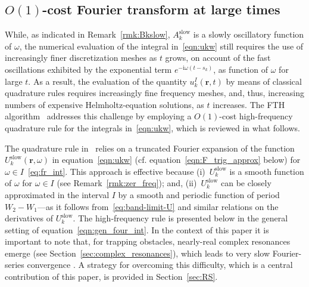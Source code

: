 \documentclass[11pt]{article}
\theoremstyle{plain}
\theoremstyle{remark}
\def \br{\mathbf{r}}
\begin{document}
\subsection{$O(1)$-cost Fourier transform at large times}\label{sec:inv_four_tran}
While, as indicated in Remark~\ref{rmk:Bkslow}, $A_k^{\mathrm{slow}}$
is a slowly oscillatory function of $\omega$, the numerical evaluation
of the integral in~\eqref{eqn:ukw} still requires the use of
increasingly finer discretization meshes as $t$ grows, on account of
the fast oscillations exhibited by the exponential term
$e^{-\mathrm{i}\omega (t - s_k)}$, as function of $\omega$ for large
$t$. As a result, the evaluation of the quantity $u^{I}_k(\br,t)$ by
means of classical quadrature rules requires increasingly fine
frequency meshes, and, thus, increasing numbers of expensive
Helmholtz-equation solutions, as $t$ increases. The FTH
algorithm~\cite{abl} addresses this challenge by employing a
$O(1)$-cost high-frequency quadrature rule for the integrals
in~\eqref{eqn:ukw}, which is reviewed in what follows.

The quadrature rule in~\cite{abl} relies on a truncated Fourier
expansion of the function $U_k^\mathrm{slow}(\br,\omega)$ in
equation~\eqref{eqn:ukw} (cf. equation~\eqref{eqn:F_trig_approx}
below) for $\omega \in I$~\eqref{eq:fr_int}. This approach is
effective because (i)~$U_k^\mathrm{slow}$ is a smooth function of
$\omega$ for $\omega\in I$ (see Remark~\ref{rmk:zer_freq}); and,
(ii)~$U_k^\mathrm{slow}$ can be closely approximated in the interval
$I$ by a smooth and periodic function of period $W_2-W_1$---as it
follows from~\eqref{eq:band-limit-U} and similar relations on the
derivatives of $U_k^\mathrm{slow}$. The high-frequency rule is
presented below in the general setting of
equation~\eqref{eqn:gen_four_int}. In the context of this paper it is
important to note that, for trapping obstacles, nearly-real complex
resonances emerge (see Section~\ref{sec:complex_resonances}), which
leads to very slow Fourier-series convergence . A strategy for
overcoming this difficulty, which is a central contribution of this
paper, is provided in Section~\ref{sec:RS}.
\end{document}
